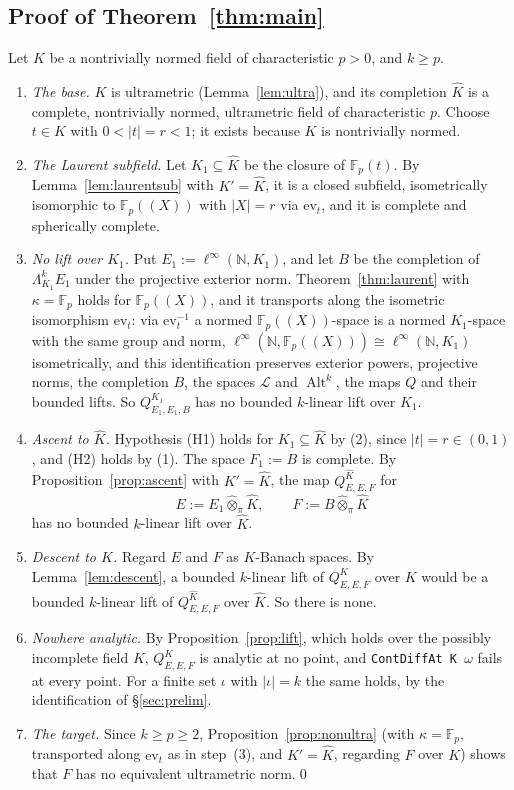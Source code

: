 \documentclass[11pt]{amsart}
\theoremstyle{definition}
\theoremstyle{remark}
\numberwithin{equation}{section}
\newcommand{\linf}{\ell^\infty}
\newcommand{\N}{\mathbb{N}}
\newcommand{\F}{\mathbb{F}}
\newcommand{\cL}{\mathcal{L}}
\newcommand{\Alt}{\operatorname{Alt}}
\newcommand{\Kh}{\widehat K}
\newcommand{\abs}[1]{\lvert #1\rvert}
\begin{document}
\subsection{Proof of Theorem~\ref{thm:main}}
Let $K$ be a nontrivially normed field of characteristic $p>0$, and $k\ge p$.
\begin{enumerate}
\item \emph{The base.} $K$ is ultrametric (Lemma~\ref{lem:ultra}), and its completion $\Kh$ is a complete, nontrivially
normed, ultrametric field of characteristic $p$. Choose $t\in K$ with $0<\abs t=r<1$; it exists because $K$ is
nontrivially normed.
\item \emph{The Laurent subfield.} Let $K_1\subseteq\Kh$ be the closure of $\F_p(t)$. By Lemma~\ref{lem:laurentsub} with
$K'=\Kh$, it is a closed subfield, isometrically isomorphic to $\F_p((X))$ with $\abs X=r$ via $\mathrm{ev}_t$, and it is
complete and spherically complete.
\item \emph{No lift over $K_1$.} Put $E_1:=\linf(\N,K_1)$, and let $B$ be the completion of $\Lambda^k_{K_1}E_1$ under the
projective exterior norm. Theorem~\ref{thm:laurent} with $\kappa=\F_p$ holds for $\F_p((X))$, and it transports along the
isometric isomorphism $\mathrm{ev}_t$: via $\mathrm{ev}_t^{-1}$ a normed $\F_p((X))$\nobreakdash-space is a normed $K_1$\nobreakdash-space with the
same group and norm, $\linf(\N,\F_p((X)))\cong\linf(\N,K_1)$ isometrically, and this identification preserves exterior
powers, projective norms, the completion $B$, the spaces $\cL$ and $\Alt^k$, the maps $Q$ and their bounded lifts. So
$Q^{K_1}_{E_1,E_1,B}$ has no bounded $k$\nobreakdash-linear lift over $K_1$.
\item \emph{Ascent to $\Kh$.} Hypothesis (H1) holds for $K_1\subseteq\Kh$ by (2), since $\abs t=r\in(0,1)$, and (H2)
holds by (1). The space $F_1:=B$ is complete. By Proposition~\ref{prop:ascent} with $K'=\Kh$, the map
$Q^{\Kh}_{E,E,F}$ for
\[
E:=E_1\widehat\otimes_\pi\Kh,\qquad F:=B\widehat\otimes_\pi\Kh
\]
has no bounded $k$\nobreakdash-linear lift over $\Kh$.
\item \emph{Descent to $K$.} Regard $E$ and $F$ as $K$\nobreakdash-Banach spaces. By Lemma~\ref{lem:descent}, a bounded
$k$\nobreakdash-linear lift of $Q^K_{E,E,F}$ over $K$ would be a bounded $k$\nobreakdash-linear lift of $Q^{\Kh}_{E,E,F}$ over $\Kh$. So
there is none.
\item \emph{Nowhere analytic.} By Proposition~\ref{prop:lift}, which holds over the possibly incomplete field $K$,
$Q^K_{E,E,F}$ is analytic at no point, and \texttt{ContDiffAt K $\omega$} fails at every point. For a finite set $\iota$
with $\abs\iota=k$ the same holds, by the identification of \S\ref{sec:prelim}.
\item \emph{The target.} Since $k\ge p\ge2$, Proposition~\ref{prop:nonultra} (with $\kappa=\F_p$, transported along $\mathrm{ev}_t$ as in
step~(3), and $K'=\Kh$, regarding $F$ over $K$) shows that $F$ has no equivalent ultrametric norm.\qed
\end{enumerate}
\end{document}
